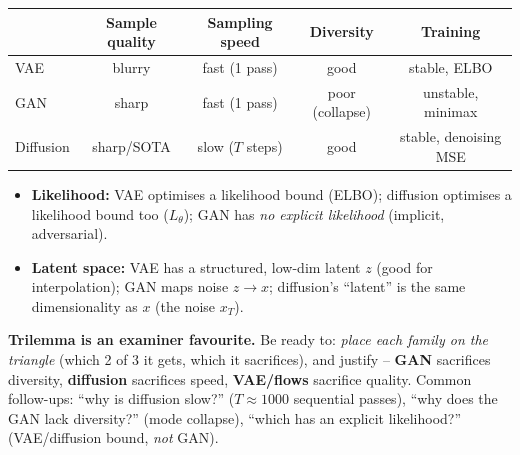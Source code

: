 \documentclass[10pt,a4paper]{article}
\begin{document}
	\begin{center}
	\begin{tabular}{@{}lcccc@{}}
		\toprule
		& \textbf{Sample quality} & \textbf{Sampling speed} & \textbf{Diversity} & \textbf{Training} \\
		\midrule
		VAE       & blurry        & fast (1 pass)      & good   & stable, ELBO \\
		GAN       & sharp         & fast (1 pass)      & poor (collapse) & unstable, minimax \\
		Diffusion & sharp/SOTA    & slow ($T$ steps)   & good   & stable, denoising MSE \\
		\bottomrule
	\end{tabular}
	\end{center}

	\begin{itemize}[leftmargin=*]
		\item \textbf{Likelihood:} VAE optimises a likelihood bound (ELBO); diffusion optimises a likelihood bound too ($L_\theta$); GAN has \emph{no explicit likelihood} (implicit, adversarial).
		\item \textbf{Latent space:} VAE has a structured, low-dim latent $z$ (good for interpolation); GAN maps noise $z\to x$; diffusion's ``latent'' is the same dimensionality as $x$ (the noise $x_T$).
	\end{itemize}

	\begin{examtipbox}
		\textbf{Trilemma is an examiner favourite.} Be ready to: \emph{place each family on the triangle} (which 2 of 3 it gets, which it sacrifices), and justify -- \textbf{GAN} sacrifices diversity, \textbf{diffusion} sacrifices speed, \textbf{VAE/flows} sacrifice quality. Common follow-ups: ``why is diffusion slow?'' ($T\!\approx\!1000$ sequential passes), ``why does the GAN lack diversity?'' (mode collapse), ``which has an explicit likelihood?'' (VAE/diffusion bound, \emph{not} GAN).
	\end{examtipbox}
\end{document}
